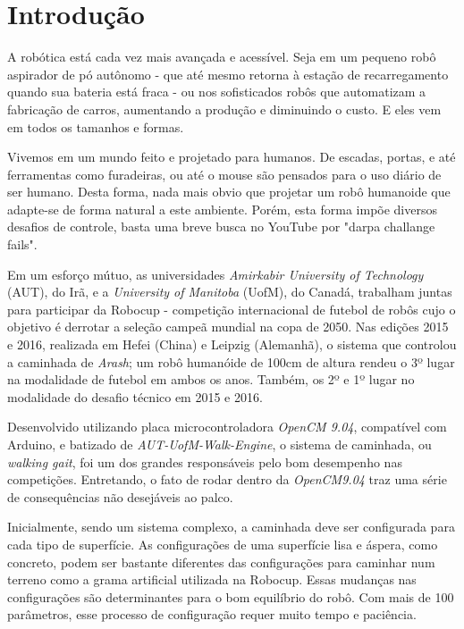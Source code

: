 \chapter{Introdução}

A robótica está cada vez mais avançada e acessível. Seja em um pequeno robô aspirador de pó autônomo - que até mesmo retorna à estação de recarregamento quando sua bateria está fraca - ou nos sofisticados robôs que automatizam a fabricação de carros, aumentando a produção e diminuindo o custo. E eles vem em todos os tamanhos e formas.

Vivemos em um mundo feito e projetado para humanos. De escadas, portas, e até ferramentas como furadeiras, ou até o mouse são pensados para o uso diário de ser humano. Desta forma, nada mais obvio que projetar um robô humanoide que adapte-se de forma natural a este ambiente. Porém, esta forma impõe diversos desafios de controle, basta uma breve busca no YouTube por "darpa challange fails".

Em um esforço mútuo, as universidades \textit{Amirkabir University of Technology} (AUT), do Irã, e a \textit{University of Manitoba} (UofM), do Canadá, trabalham juntas para participar da Robocup - competição internacional de futebol de robôs cujo o objetivo é derrotar a seleção campeã mundial na copa de 2050. Nas edições 2015 e 2016, realizada em Hefei (China) e Leipzig (Alemanhã), o sistema que controlou a caminhada de \textit{Arash}; um robô humanóide de 100cm de altura rendeu o 3º lugar na modalidade de futebol em ambos os anos. Também, os 2º e 1º lugar no modalidade do desafio técnico em 2015 e 2016.

Desenvolvido utilizando placa microcontroladora \textit{OpenCM 9.04}, compatível com Arduino, e batizado de \textit{AUT-UofM-Walk-Engine}, o sistema de caminhada, ou \textit{walking gait}, foi um dos grandes responsáveis pelo bom desempenho nas competições. Entretando, o fato de rodar dentro da \textit{OpenCM9.04} traz uma série de consequências não desejáveis ao palco.

Inicialmente, sendo um sistema complexo, a caminhada deve ser configurada para cada tipo de superfície. As configurações de uma superfície lisa e áspera, como concreto, podem ser bastante diferentes das configurações para caminhar num terreno como a grama artificial utilizada na Robocup. Essas mudanças nas configurações são determinantes para o bom equilíbrio do robô. Com mais de 100 parâmetros, esse processo de configuração requer muito tempo e paciência.

